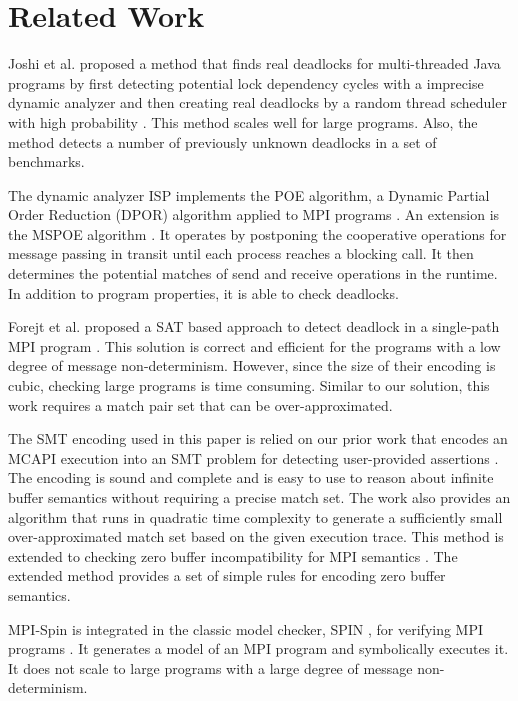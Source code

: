 \section{Related Work}
Joshi et al. proposed a method that finds real deadlocks for multi-threaded Java programs by first detecting potential lock dependency cycles with a imprecise dynamic analyzer and then creating real deadlocks by a random thread scheduler with high probability \cite{DBLP:conf/pldi/JoshiPSN09}. This method scales well for large programs. Also, the method detects a number of previously unknown deadlocks in a set of benchmarks.

The dynamic analyzer ISP implements the POE algorithm, a Dynamic Partial Order Reduction (DPOR) algorithm \cite{DBLP:conf/popl/FlanaganG05} applied to MPI programs \cite{DBLP:conf/ppopp/VakkalankaSGK08}. An extension is the MSPOE algorithm \cite{DBLP:conf/sbmf/SharmaGB12}. It operates by postponing the cooperative operations for message passing in transit until each process reaches a blocking call. It then determines the potential matches of send and receive operations in the runtime. In addition to program properties, it is able to check deadlocks.

Forejt et al. proposed a SAT based approach to detect deadlock in a single-path MPI program \cite{DBLP:conf/fm/ForejtKNS14}. This solution is correct and efficient for the programs with a low degree of message non-determinism. However, since the size of their encoding is cubic, checking large programs is time consuming. Similar to our solution, this work requires a match pair set that can be over-approximated.

The SMT encoding used in this paper is relied on our prior work that encodes an MCAPI execution into an SMT problem for detecting user-provided assertions \cite{DBLP:conf/kbse/HuangMM13}. The encoding is sound and complete and is easy to use to reason about infinite buffer semantics without requiring a precise match set. The work also provides an algorithm that runs in quadratic time complexity to generate a sufficiently small over-approximated match set based on the given execution trace. This method is extended to checking zero buffer incompatibility for MPI semantics \cite{HuangNFM15}. The extended method provides a set of simple rules for encoding zero buffer semantics. 

MPI-Spin is integrated in the classic model checker, SPIN \cite{DBLP:journals/tse/Holzmann97}, for verifying MPI programs \cite{DBLP:conf/vmcai/Siegel07,DBLP:conf/pvm/Siegel07}. It generates a model of an MPI program and symbolically executes it. It does not scale to large programs with a large degree of message non-determinism.

